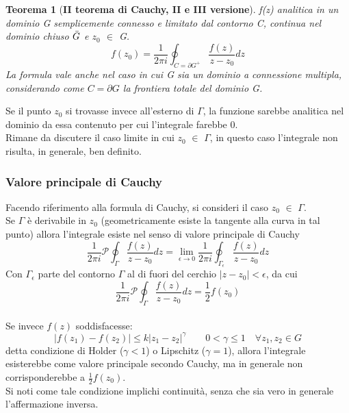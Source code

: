 \documentclass[twoside]{article}
\newtheorem{theorem}{Teorema}[section]
\begin{document}
\begin{theorem}[\textbf{II teorema di Cauchy, II e III versione}]\label{II Cauchy 2.3v}
f(z) analitica in un dominio G semplicemente connesso e limitato dal contorno C, continua nel dominio chiuso $\Bar{G}$ e $z_0$ $\in$ G.
\begin{equation}
    f(z_0)=\frac{1}{2\pi i}\oint_{C=\partial G^+}\frac{f(z)}{z-z_0}dz
\end{equation}
La formula vale anche nel caso in cui G sia un dominio a connessione multipla, considerando come $C=\partial G$ la frontiera totale del dominio G.\\
\end{theorem}

Se il punto $z_0$ si trovasse invece all'esterno di $\Gamma$, la funzione sarebbe analitica nel dominio da essa contenuto per cui l'integrale farebbe 0.\\
Rimane da discutere il caso limite in cui $z_0$ $\in$ $\Gamma$, in questo caso l'integrale non risulta, in generale, ben definito.
\subsubsection{Valore principale di Cauchy}
Facendo riferimento alla formula di Cauchy, si consideri il caso $z_0$ $\in$ $\Gamma$.
\\
Se $\Gamma$ è derivabile in $z_0$ (geometricamente esiste la tangente alla curva in tal punto) allora l'integrale esiste nel senso di valore principale di Cauchy
\begin{equation}
   \frac{1}{2\pi i}\mathscr{P}\oint_{\Gamma}\frac{f(z)}{z-z_0}dz=\lim_{\epsilon\to 0}\frac{1}{2\pi i}\oint_{\Gamma_\epsilon}\frac{f(z)}{z-z_0}dz
\end{equation}
Con $\Gamma_\epsilon$ parte del contorno $\Gamma$ al di fuori del cerchio $|z-z_0|<\epsilon$, da cui
\begin{equation}
    \frac{1}{2\pi i}\mathscr{P}\oint_{\Gamma}\frac{f(z)}{z-z_0}dz=\frac{1}{2}f(z_0)
\end{equation}
\\
Se invece $f(z)$ soddisfacesse:
\begin{equation}
    |f(z_1)-f(z_2)|\le k|z_1-z_2|^\gamma \qquad 0<\gamma\le 1 \quad \forall z_1,z_2\in G
\end{equation}
detta condizione di Holder ($\gamma<1$) o Lipschitz ($\gamma=1$), allora l'integrale esisterebbe come valore principale secondo Cauchy, ma in generale non corrisponderebbe a $\frac{1}{2}f(z_0)$.\\
Si noti come tale condizione implichi continuità, senza che sia vero in generale l'affermazione inversa.
\end{document}
